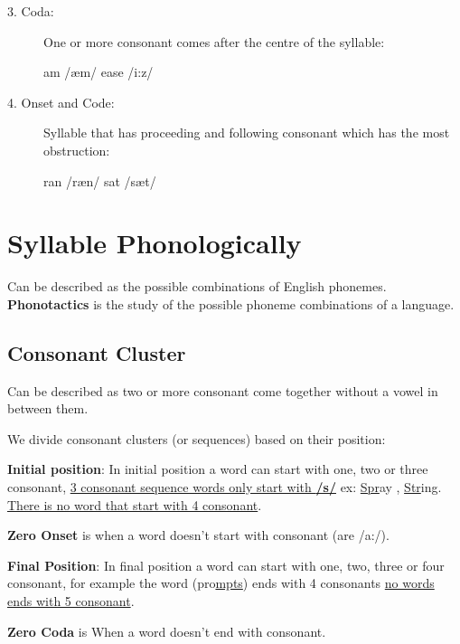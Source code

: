 \documentclass[12pt, a4paper]{memoir}
\begin{document}
{\begin{description}
  \item[3. Coda:]One or more consonant comes after the centre of the 
    syllable:\medbreak

    \centerline{am /æm/ \hspace{2cm} ease /i:z/}

  \item[4. Onset and Code:]Syllable that has proceeding and following
    consonant which has the most obstruction:\medbreak

    \centerline{ran /ræn/ \hspace{2cm} sat /sæt/}
  
\end{description}

\section*{Syllable Phonologically}

Can be described as the possible combinations 
of English phonemes.\medbreak
\textbf{Phonotactics} is the study of the possible phoneme combinations
of a language.\bigbreak

\subsection*{Consonant Cluster}
Can be described as two or more consonant come together without a vowel
in between them.\medbreak

We divide consonant clusters (or sequences) based on their position:\medbreak

\textbf{Initial position}: In initial position a word can start with one,
two or three consonant, \underline{3 consonant sequence words only start 
with \textbf{/s/}} ex: \underline{Spr}ay , \underline{Str}ing.
\underline{There is no word that start with 
4 consonant}.\medbreak 

\textbf{Zero Onset} is when a word doesn't start with consonant 
(are /a:/).\bigbreak

\textbf{Final Position}: In final position a word can start with one,
two, three or four consonant, for example the word (pro\underline{mpts})
ends with 4 consonants \underline{no words ends with 5 consonant}.\medbreak

\textbf{Zero Coda} is When a word doesn't end with consonant.
}
\end{document}
